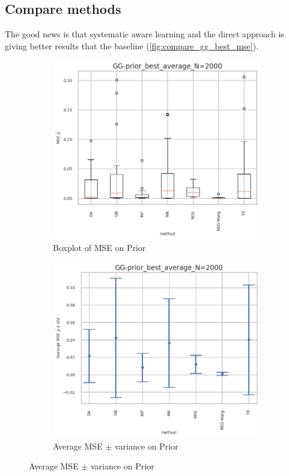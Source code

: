 \subsection{Compare methods} %
\label{sub:compare_methods}


The good news is that systematic aware learning and the direct approach is giving better results that the baseline (\autoref{fig:compare_gg_best_mse}).

\begin{figure}[ht!]
  \centering
  \begin{subfigure}[t]{0.49\linewidth}
    \includegraphics[width=\linewidth]{COMPARE/GG-prior/BEST_MSE/GG-prior_best_average_N=2000-boxplot_mse.png}
    \caption{Boxplot of MSE on Prior}
  \end{subfigure}%
  \hfill
  \begin{subfigure}[t]{0.49\linewidth}
    \includegraphics[width=\linewidth]{COMPARE/GG-prior/BEST_MSE/GG-prior_best_average_N=2000-errplot_mse.png}
    \caption{Average MSE $\pm$ variance on Prior}
  \end{subfigure}


\end{figure}
